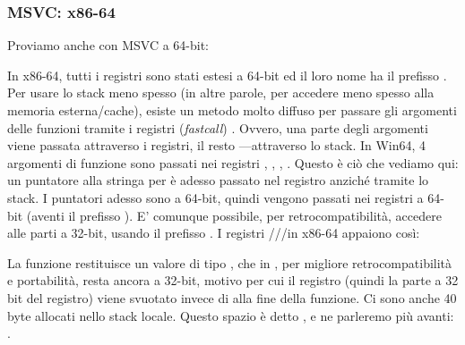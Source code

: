 \subsubsection{MSVC: x86-64}

Proviamo anche con MSVC a 64-bit:




In x86-64, tutti i registri sono stati estesi a 64-bit ed il loro nome ha il prefisso .
Per usare lo stack meno spesso (in altre parole, per accedere meno spesso alla memoria esterna/cache), esiste un metodo molto diffuso per passare gli argomenti delle funzioni tramite i registri (\emph{fastcall})
.
Ovvero, una parte degli argomenti viene passata attraverso i registri, il resto ---attraverso lo stack.
In Win64, 4 argomenti di funzione sono passati nei registri \RCX, \RDX, , .
Questo è ciò che vediamo qui: un puntatore alla stringa per \printf è adesso passato nel registro \RCX anziché tramite lo stack.
I puntatori adesso sono a 64-bit, quindi vengono passati nei registri a 64-bit (aventi il prefisso ).
E' comunque possibile, per retrocompatibilità, accedere alle parti a 32-bit, usando il prefisso .
I registri \RAX/\EAX/\AX/\AL in x86-64 appaiono così:


La funzione \main restituisce un valore di tipo \Tint{}, che in \CCpp, per migliore retrocompatibilità e portabilità, resta ancora a 32-bit, motivo per cui il registro \EAX (quindi la parte a 32 bit del registro) viene svuotato invece di \RAX{} alla fine della funzione.
Ci sono anche 40 byte allocati nello stack locale.
Questo spazio è detto , e ne parleremo più avanti: .
